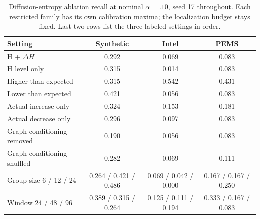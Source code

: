 \begin{table}[t]\centering\caption{Diffusion-entropy ablation recall at nominal $\alpha=.10$, seed 17 throughout. Each restricted family has its own calibration maxima; the localization budget stays fixed. Last two rows list the three labeled settings in order.}\label{tab:ablations}\small
\begin{tabular}{lccc}\toprule Setting & Synthetic & Intel & PEMS\\\midrule
H + $\Delta H$ & 0.292 & 0.069 & 0.083 \\
H level only & 0.315 & 0.014 & 0.083 \\
Higher than expected & 0.315 & 0.542 & 0.431 \\
Lower than expected & 0.421 & 0.056 & 0.083 \\
Actual increase only & 0.324 & 0.153 & 0.181 \\
Actual decrease only & 0.296 & 0.097 & 0.083 \\
Graph conditioning removed & 0.190 & 0.056 & 0.083 \\
Graph conditioning shuffled & 0.282 & 0.069 & 0.111 \\
Group size 6 / 12 / 24 & 0.264 / 0.421 / 0.486 & 0.069 / 0.042 / 0.000 & 0.167 / 0.167 / 0.250 \\
Window 24 / 48 / 96 & 0.389 / 0.315 / 0.264 & 0.125 / 0.111 / 0.194 & 0.333 / 0.167 / 0.083 \\
\bottomrule\end{tabular}\end{table}
